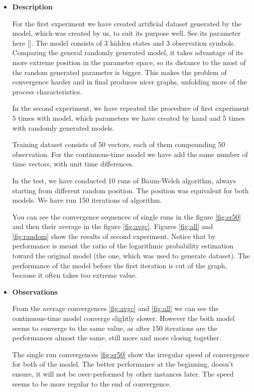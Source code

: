 \documentclass[thesis=M,english]{FITthesis}[2012/10/20]
\begin{document}
\begin{itemize}
\item \textbf{ Description }

For the first experiment we have created artificial dataset generated by the model, which was created by us, to suit its purpose well. See its parameter here []. The model consists of 3 hidden states and 3 observation symbols. Comparing the general randomly generated model, it takes advantage of its more extreme position in the parameter space, so its distance to the most of the random generated parameter is bigger. This makes the problem of convergence harder and in final produces nicer graphs, unfolding more of the process characteristics.

In the second experiment, we have repeated the procedure of first experiment 5 times with model, which parameters we have created by hand and 5 times with randomly generated models. 

Training dataset consists of 50 vectors, each of them compounding 50 observation. For the continuous-time model we have add the same number of time vectors, with unit time differences.

In the test, we have conducted 10 runs of Baum-Welch algorithm, always starting from different random position. The position was equivalent for both models. We have run 150 iterations of algorithm.

You can see the convergence sequences of single runs in the figure \ref{fig:sr50} and then their average in the figure \ref{fig:avgc}. Figures \ref{fig:all} and \ref{fig:random} show the results of second experiment. Notice that by performance is meant the ratio of the logarithmic probability estimation toward the original model (the one, which was used to generate dataset). The performance of the model before the first iteration is cut of the graph, because it often takes too extreme value.

\item \textbf{ Observations }

From the average convergences \ref{fig:avgc} and \ref{fig:all} we can see the continuous-time model converge slightly slower. However the both model seems to converge to the same value, as after 150 iterations are the performances almost the same, still more and more closing together.
 
The single run convergences \ref{fig:sr50} show the irregular speed of convergence for both of the model. The better performance at the beginning, doesn't ensure, it will not be over-performed by other instances later. The speed seems to be more regular to the end of convergence.


\end{itemize}
\end{document}
